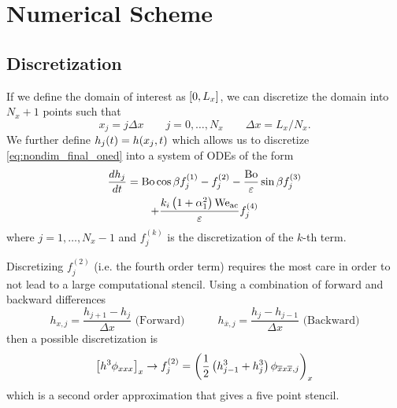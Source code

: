 \section{Numerical Scheme}
\subsection{Discretization}
\begin{frame}
    If we define the domain of interest as $\left[ 0, L_x \right]$, we can discretize the 
    domain into $N_x + 1$ points such that
    \begin{equation*}
        x_j = j\Delta x \quad \quad j = 0, \ldots, N_x \quad \quad \Delta x = L_x / N_x. 
    \end{equation*}
    We further define $h_j\!\left( t \right) = h\!\left( x_j, t \right)$ which allows us to discretize 
    \cref{eq:nondim_final_oned} into a system of ODEs of the form 
    \begin{multline}
        \frac{d h_j}{d t} = \mathrm{Bo}\cos \beta f_j^{(1)} - f_j^{(2)} -  \frac{\mathrm{Bo}}{\varepsilon} \sin \beta f_j^{(3)} 
        \\ + \frac{k_i \left( 1 + \alpha_1^2 \right) \mathrm{We_{ac}}}{\varepsilon} f_j^{(4)}
        \label{eq:ode_sys}
    \end{multline}
    where $j = 1, \ldots, N_x - 1$ and $f_j^{(k)}$ is the discretization of the $k$-th term. 
\end{frame}
\begin{frame}
    Discretizing $f_j^{(2)}$ (i.e. the fourth order term) requires the most care 
    in order to not lead to a large computational stencil. Using a combination of forward
    and backward differences
    \begin{equation*}
        h_{x, j} = \frac{h_{j+1} - h_j}{\Delta x} \text{ (Forward)} \quad \quad \quad h_{\overline{x}, j} = \frac{h_{j} - h_{j-1}}{\Delta x} \text{ (Backward)}
    \end{equation*}
    then a possible discretization is 
    \begin{equation*}
        \left[ h^3\phi_{xxx} \right]_x \rightarrow f_j^{\left( 2 \right)} = \left( \frac{1}{2}\left( h_{j-1}^3 + h_j^3 \right) \phi_{\overline{x}x\overline{x}, j} \right)_{x}
    \end{equation*}
    which is a second order approximation that gives a five point stencil. 
\end{frame}
